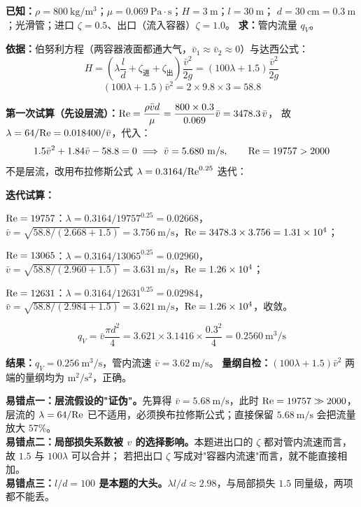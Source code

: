 \begin{jie}
\textbf{已知：}$\rho=800\ \mathrm{kg/m^3}$；$\mu=0.069\ \mathrm{Pa\cdot s}$；$H=3\ \mathrm{m}$；$l=30\ \mathrm{m}$；
$d=30\ \mathrm{cm}=0.3\ \mathrm{m}$；光滑管；进口 $\zeta=0.5$、出口（流入容器）$\zeta=1.0$。
\textbf{求：}管内流量 $q_V$。

\textbf{依据：}伯努利方程（两容器液面都通大气，$\bar v_1\approx\bar v_2\approx0$）与达西公式：
\[ H=\left(\lambda\frac ld+\zeta_{\text{进}}+\zeta_{\text{出}}\right)\frac{\bar v^2}{2g}
=\left(100\lambda+1.5\right)\frac{\bar v^2}{2g} \]
\[ \left(100\lambda+1.5\right)\bar v^2=2\times9.8\times3=58.8 \]

\textbf{第一次试算（先设层流）：}$\mathrm{Re}=\dfrac{\rho\bar vd}{\mu}=\dfrac{800\times0.3}{0.069}\bar v=3478.3\,\bar v$，
故 $\lambda=64/\mathrm{Re}=0.018400/\bar v$，代入：
\[ 1.5\bar v^2+1.84\bar v-58.8=0\;\Longrightarrow\;\bar v=5.680\ \mathrm{m/s},\qquad \mathrm{Re}=19757>2000 \]
不是层流，改用布拉修斯公式 $\lambda=0.3164/\mathrm{Re}^{0.25}$ 迭代：

\textbf{迭代试算：}
\begin{xiaowen}
\item $\mathrm{Re}=19757$：$\lambda=0.3164/19757^{0.25}=0.02668$，
$\bar v=\sqrt{58.8/(2.668+1.5)}=3.756\ \mathrm{m/s}$，$\mathrm{Re}=3478.3\times3.756=1.31\times10^4$；
\item $\mathrm{Re}=13065$：$\lambda=0.3164/13065^{0.25}=0.02960$，
$\bar v=\sqrt{58.8/(2.960+1.5)}=3.631\ \mathrm{m/s}$，$\mathrm{Re}=1.26\times10^4$；
\item $\mathrm{Re}=12631$：$\lambda=0.3164/12631^{0.25}=0.02984$，
$\bar v=\sqrt{58.8/(2.984+1.5)}=3.621\ \mathrm{m/s}$，$\mathrm{Re}=1.26\times10^4$，收敛。
\end{xiaowen}
\[ q_V=\bar v\frac{\pi d^2}{4}=3.621\times3.1416\times\frac{0.3^2}{4}=0.2560\ \mathrm{m^3/s} \]

\textbf{结果：}$q_V=0.256\ \mathrm{m^3/s}$，管内流速 $\bar v=3.62\ \mathrm{m/s}$。
\textbf{量纲自检：}$(100\lambda+1.5)\bar v^2$ 两端的量纲均为 $\mathrm{m^2/s^2}$，正确。
\end{jie}

\begin{yicuo}
\textbf{易错点一：层流假设的"证伪"。}先算得 $\bar v=5.68\ \mathrm{m/s}$，此时 $\mathrm{Re}=19757\gg2000$，
层流的 $\lambda=64/\mathrm{Re}$ 已不适用，必须换布拉修斯公式；直接保留 $5.68\ \mathrm{m/s}$ 会把流量放大 $57\%$。\\
\textbf{易错点二：局部损失系数被 $v$ 的选择影响。}本题进出口的 $\zeta$ 都对管内流速而言，故 $1.5$ 与 $100\lambda$ 可以合并；
若把出口 $\zeta$ 写成对"容器内流速"而言，就不能直接相加。\\
\textbf{易错点三：$l/d=100$ 是本题的大头。}$\lambda l/d\approx2.98$，与局部损失 $1.5$ 同量级，两项都不能丢。
\end{yicuo}


